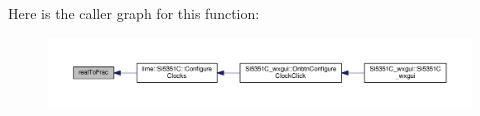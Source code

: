 Here is the caller graph for this function\+:
\nopagebreak
\begin{figure}[H]
\begin{center}
\leavevmode
\includegraphics[width=350pt]{d3/d0f/Si5351C_8cpp_a5c83c3b2f7276ba413fb23176518f3c4_icgraph}
\end{center}
\end{figure}


